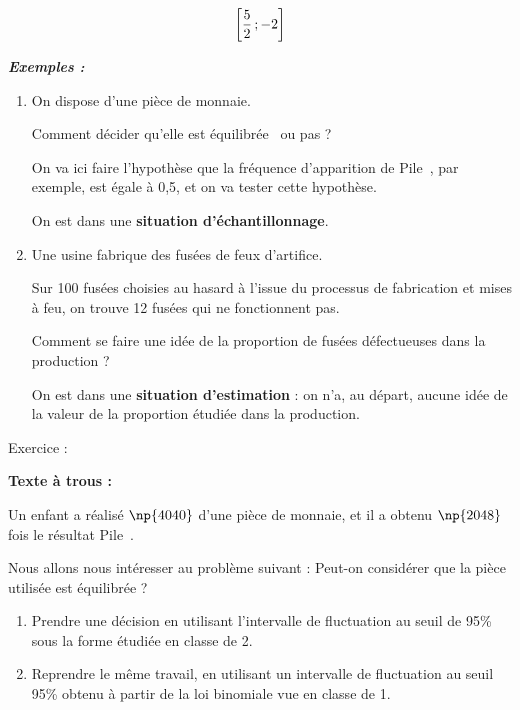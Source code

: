 \begin{spacing}{1.2}
\[\left[\frac{5}{2}\,;-2\right]\]


\textbf{\textit{Exemples :}}
\begin{enumerate}
\item On dispose d'une pièce de monnaie.

Comment décider qu'elle est \og équilibrée\fg~ ou pas ?

On va ici faire l'hypothèse que la fréquence d'apparition de \og Pile\fg~, par exemple, est égale à 0,5, et on va tester cette hypothèse.

On est dans une \textbf{situation d'échantillonnage}.

\item Une usine fabrique des fusées de feux d'artifice.

Sur 100 fusées choisies au hasard à l'issue du processus de fabrication et mises à feu, on trouve 12 fusées qui ne fonctionnent pas.

Comment se faire une idée de la proportion de fusées défectueuses dans la production ?

On est dans une \textbf{situation d'estimation} : on n'a, au départ, aucune idée de la valeur de la proportion étudiée dans la production.
\end{enumerate}

\medskip

\begin{center}
\PapierMill{10cm}{10cm}
\end{center}

\begin{bclogo}[couleur = blue!30 , arrondi = 0.1 ,logo = \bclampe , barre = snake , tailleOndu = 1.5]{Exercice :}


\textbf{Texte à trous :}

Un enfant a réalisé $\np{4040}$  d'une pièce de monnaie, et il a obtenu $\np{2048}$ fois le résultat \og Pile\fg~.

Nous allons nous intéresser au problème suivant : \og Peut-on considérer que la pièce utilisée est équilibrée ?\fg~

\begin{enumerate}
\item Prendre une décision en utilisant l'intervalle de fluctuation au seuil de 95\% sous la forme étudiée en classe de 2.
\item Reprendre le même travail, en utilisant un intervalle de fluctuation au seuil 95\% obtenu à partir de la loi binomiale vue en classe de 1.
\end{enumerate}
\end{bclogo}



\end{spacing}
